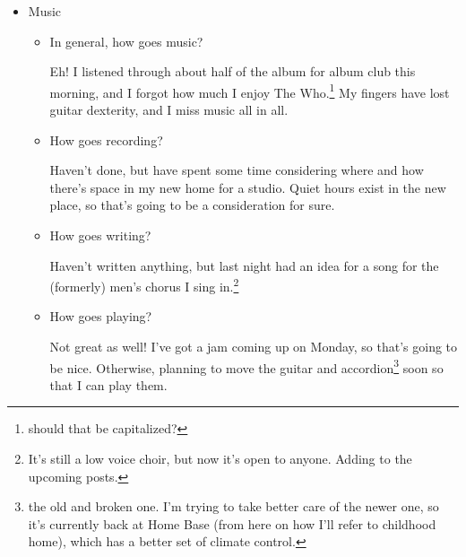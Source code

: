\documentclass[12pt]{article}
\renewcommand{\,}{\textsuperscript{,}}
\begin{document}
\begin{itemize}
\begin{itemize}
\begin{itemize}
\item We're counting audio book here, anything good?

Been relistening to Dungeon Crawler Carl to get into the new book.  
I don't know that I listened to it at all in June, but I did listen to a full six hours while working on the embroidery design yesterday. I've almost finished Bedlam Bride.

\item Upon reflection, how's the written word? Anything missing in the five questions?

I think good! All in all pretty happy with how I relate to it. Don't think that there's anything missing!

\end{itemize}

\item Music

\begin{itemize}

\item In general, how goes music?

Eh! I listened through about half of the album for album club this morning, and I forgot how much I enjoy The Who.\footnote{should that be capitalized?}  
My fingers have lost guitar dexterity, and I miss music all in all.

\item How goes recording?

Haven't done, but have spent some time considering where and how there's space in my new home for a studio.  
Quiet hours exist in the new place, so that's going to be a consideration for sure.

\item How goes writing?

Haven't written anything, but last night had an idea for a song for the (formerly) men's chorus I sing in.\footnote{It's still a low voice choir, but now it's open to anyone. Adding to the upcoming posts.}

\item How goes playing?

Not great as well! I've got a jam coming up on Monday, so that's going to be nice.  
Otherwise, planning to move the guitar and accordion\footnote{the old and broken one. I'm trying to take better care of the newer one, so it's currently back at Home Base (from here on how I'll refer to childhood home), which has a better set of climate control.} soon so that I can play them.


\end{itemize}
\end{itemize}
\end{itemize}
\end{document}
